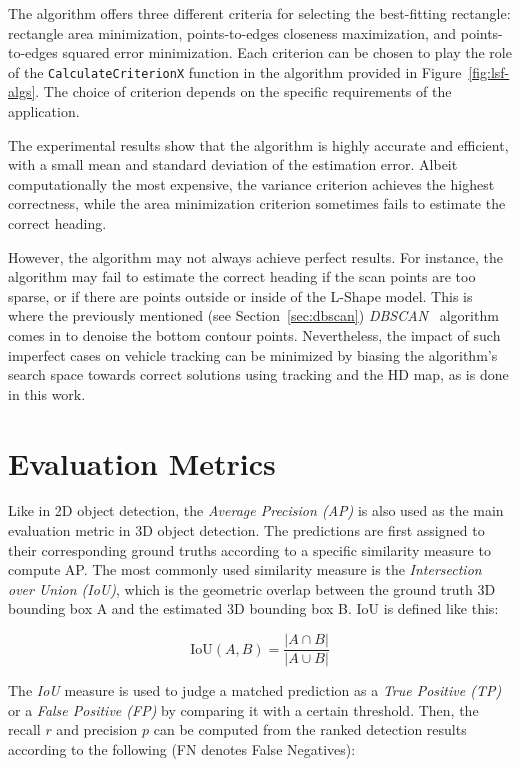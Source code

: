 The algorithm offers three different criteria for selecting the best-fitting rectangle: rectangle area minimization, points-to-edges closeness maximization, and points-to-edges squared error minimization.
Each criterion can be chosen to play the role of the \texttt{CalculateCriterionX} function in the algorithm provided in Figure~\ref{fig:lsf-algs}.
The choice of criterion depends on the specific requirements of the application.

The experimental results show that the algorithm is highly accurate and efficient, with a small mean and standard deviation of the estimation error.
Albeit computationally the most expensive, the variance criterion achieves the highest correctness, while the area minimization criterion sometimes fails to estimate the correct heading.

However, the algorithm may not always achieve perfect results.
For instance, the algorithm may fail to estimate the correct heading if the scan points are too sparse, or if there are points outside or inside of the L-Shape model.
This is where the previously mentioned (see Section~\ref{sec:dbscan}) \textit{DBSCAN}~\cite{schubert2017dbscan} algorithm comes in to denoise the bottom contour points.
Nevertheless, the impact of such imperfect cases on vehicle tracking can be minimized by biasing the algorithm's search space towards correct solutions using tracking and the HD map, as is done in this work.


\section{Evaluation Metrics}
\label{sec:evalmetrics}

Like in 2D object detection, the \textit{Average Precision (AP)} is also used as the main evaluation metric in 3D object detection.
The predictions are first assigned to their corresponding ground truths according to a specific similarity measure to compute AP\@.
The most commonly used similarity measure is the \textit{Intersection over Union (IoU)}, which is the geometric overlap between the ground truth 3D bounding box A and the estimated 3D bounding box B\@.
IoU is defined like this:

\[
\text{IoU}(A,B) = \frac{|A \cap B|}{|A \cup B|}
\]

The \textit{IoU} measure is used to judge a matched prediction as a \textit{True Positive (TP)} or a \textit{False Positive (FP)} by comparing it with a certain threshold.
Then, the recall $r$ and precision $p$ can be computed from the ranked detection results according to the following (FN denotes False Negatives):

